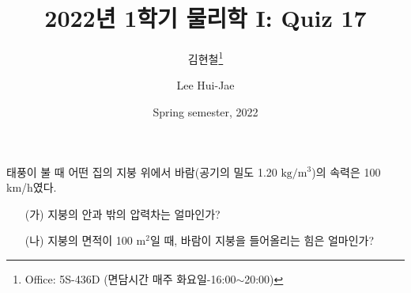 \documentclass[floatfix,nofootinbib,superscriptaddress,fleqn]{revtex4-2}
\begin{document}
\title{\Large 2022년 1학기 물리학 I: Quiz 17}
\author{김현철\footnote{Office: 5S-436D (면담시간 매주
    화요일-16:00$\sim$20:00)}} 
\author{Lee Hui-Jae} 
\date{Spring semester, 2022}


\vspace{1.cm}

\maketitle


태풍이 불 때 어떤 집의 지붕 위에서 바람(공기의 밀도 1.20 $\mathrm{kg/m^3}$)의
속력은 100 km/h였다.
\begin{itemize}
\item[(가)] 지붕의 안과 밖의 압력차는 얼마인가? 
\item[(나)] 지붕의 면적이 100 $\mathrm{m^2}$일 때, 바람이 지붕을
  들어올리는 힘은 얼마인가? 
 \end{itemize}
\end{document}

